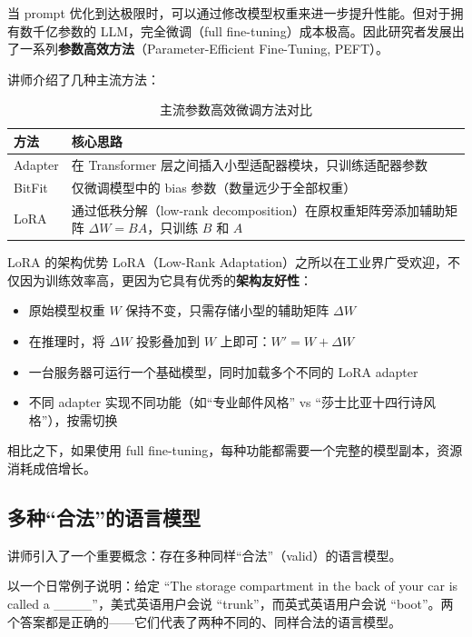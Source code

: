 \documentclass[a4paper]{article}
\begin{document}
当 prompt 优化到达极限时，可以通过修改模型权重来进一步提升性能。但对于拥有数千亿参数的 LLM，完全微调（full fine-tuning）成本极高。因此研究者发展出了一系列\textbf{参数高效方法}（Parameter-Efficient Fine-Tuning, PEFT）。

讲师介绍了几种主流方法：

\begin{table}[H]
\centering
\begin{tabular}{lp{8cm}}
\toprule
\textbf{方法} & \textbf{核心思路} \\
\midrule
Adapter & 在 Transformer 层之间插入小型适配器模块，只训练适配器参数 \\
BitFit  & 仅微调模型中的 bias 参数（数量远少于全部权重） \\
LoRA    & 通过低秩分解（low-rank decomposition）在原权重矩阵旁添加辅助矩阵 $\Delta W = BA$，只训练 $B$ 和 $A$ \\
\bottomrule
\end{tabular}
\caption{主流参数高效微调方法对比}
\end{table}

\begin{importantbox}{LoRA 的架构优势}
LoRA（Low-Rank Adaptation）之所以在工业界广受欢迎，不仅因为训练效率高，更因为它具有优秀的\textbf{架构友好性}：

\begin{itemize}
    \item 原始模型权重 $W$ 保持不变，只需存储小型的辅助矩阵 $\Delta W$
    \item 在推理时，将 $\Delta W$ 投影叠加到 $W$ 上即可：$W' = W + \Delta W$
    \item 一台服务器可运行一个基础模型，同时加载多个不同的 LoRA adapter
    \item 不同 adapter 实现不同功能（如``专业邮件风格'' vs ``莎士比亚十四行诗风格''），按需切换
\end{itemize}

相比之下，如果使用 full fine-tuning，每种功能都需要一个完整的模型副本，资源消耗成倍增长。
\end{importantbox}

\subsection{多种``合法''的语言模型}

讲师引入了一个重要概念：存在多种同样``合法''（valid）的语言模型。

以一个日常例子说明：给定 ``The storage compartment in the back of your car is called a \_\_\_\_''，美式英语用户会说 ``trunk''，而英式英语用户会说 ``boot''。两个答案都是正确的——它们代表了两种不同的、同样合法的语言模型。
\end{document}
